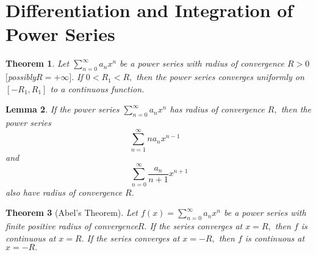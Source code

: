\documentclass[12pt]{article}
\newtheorem{theorem}{Theorem}[section]
\newtheorem{lemma}[theorem]{Lemma}
\begin{document}
\section{Differentiation and Integration of Power Series}
\begin{theorem}
	Let $\sum _ { n = 0 } ^ { \infty } a _ { n } x ^ { n }$ be a power series with radius of convergence $R > 0$
	$[$possibly$R = + \infty ] .$ If $0 < R _ { 1 } < R ,$ then the power series converges
	uniformly on $\left[ - R _ { 1 } , R _ { 1 } \right]$ to a continuous function.
\end{theorem}
\begin{lemma}
	If the power series $\sum _ { n = 0 } ^ { \infty } a _ { n } x ^ { n }$ has radius of convergence $R ,$ then the
	power series
	$$\sum _ { n = 1 } ^ { \infty } n a _ { n } x ^ { n - 1 } \quad$$ and $$\sum _ { n = 0 } ^ { \infty } \frac { a _ { n } } { n + 1 } x ^ { n + 1 }$$ also have radius of convergence $R .$
\end{lemma}

\begin{theorem}[Abel’s Theorem]
	Let $f ( x ) = \sum _ { n = 0 } ^ { \infty } a _ { n } x ^ { n }$ be a power series with finite positive radius of
	convergence$R .$ If the series converges at $x = R ,$ then $f$ is continuous
	at $x = R .$ If the series converges at $x = - R ,$ then $f$ is continuous
	at $x = - R .$
\end{theorem}
\end{document}
